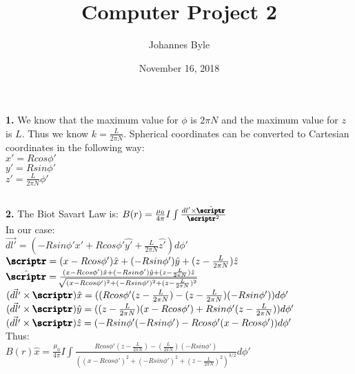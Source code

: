 \documentclass[english]{article}
\begin{document}
\title{Computer Project 2}
\author{Johannes Byle}
\date{November 16, 2018}
\maketitle
\begin{flushleft}
\subsection*{}
\textbf{1.} We know that the maximum value for $\phi$ is $2\pi N$ and the maximum value for $z$ is $L$. Thus we know $k=\frac{L}{2\pi N}$. Spherical coordinates can be converted to Cartesian coordinates in the following way:\\
$x'=Rcos\phi'$\\
$y'=Rsin\phi'$\\
$z'=\frac{L}{2\pi N}\phi'$\\
\subsection*{}
\textbf{2.} The Biot Savart Law is: $B(r)=\frac{\mu_0}{4\pi}I\int\frac{dl'\times\hat{\pmb{\scriptr}}}{\pmb{\scriptr}^2}$\\
In our case:\\
$\vec{dl'}=(-Rsin\phi'\hat{x'}+Rcos\phi'\hat{y'}+\frac{L}{2\pi N}\hat{z'})d\phi'$\\

$\pmb{\scriptr}=(x-Rcos\phi')\hat{x}+(-Rsin\phi')\hat{y}+(z-\frac{L}{2\pi N})\hat{z}$\\

$\hat{\pmb{\scriptr}}=\frac{(x-Rcos\phi')\hat{x}+(-Rsin\phi')\hat{y}+(z-\frac{L}{2\pi N})\hat{z}}{\sqrt[]{(x-Rcos\phi')^2+(-Rsin\phi')^2+(z-\frac{L}{2\pi N})^2}}$\\

$(\vec{dl'}\times\pmb{\scriptr})\hat{x}=((Rcos\phi'(z-\frac{L}{2\pi N})-(z-\frac{L}{2\pi N})(-Rsin\phi'))d\phi'$\\
$(\vec{dl'}\times\pmb{\scriptr})\hat{y}=((z-\frac{L}{2\pi N})(x-Rcos\phi')+Rsin\phi'(z-\frac{L}{2\pi N}))d\phi'$
$(\vec{dl'}\times\pmb{\scriptr})\hat{z}=(-Rsin\phi'(-Rsin\phi')-Rcos\phi'(x-Rcos\phi'))d\phi'$\\

Thus:\\
$B(r)\hat{x}=\frac{\mu_0}{4\pi}I\int\frac{Rcos\phi'(z-\frac{L}{2\pi N})-(\frac{L}{2\pi N})(-Rsin\phi')}{((x-Rcos\phi')^2+(-Rsin\phi')^2+(z-\frac{L}{2\pi N})^2)^{3/2}}d\phi'$\\


\end{flushleft}
\end{document}
